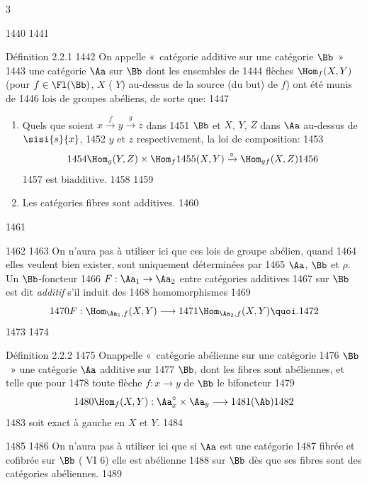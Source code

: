 3	\documentclass[10pt]{../fichiers-configuration-latex/smfart}
\begin{document}
  1440	
  1441	\begin{enonce*}{Définition 2.2.1}
  1442	On appelle « catégorie additive sur une catégorie $\Bb$ »
  1443	une catégorie $\Aa$ sur $\Bb$ dont les ensembles de
  1444	flèches $\Hom_f(X,Y)$ (pour $f\in \Fl (\Bb)$, $X$ (	$Y$) au-dessus de la source (\resp du but) de $f$) ont été munis de
  1446	lois de groupes abéliens, de sorte que:
  1447	\begin{enumerate}
  1448	\renewcommand{\theenumi}{\roman{enumi}}
  1449	\renewcommand{\labelenumi}{(\theenumi)}
  1450	\item Quels que soient $x\xrightarrow{f}y\xrightarrow{g}z$ dans
  1451	$\Bb$ et $X$, $Y$, $Z$ dans $\Aa$ au-dessus de $\sisi{s}{x}$,
  1452	$y$ et $z$ respectivement, la loi de composition:
  1453	\[
  1454	\Hom_g(Y,Z)\times \Hom_f
  1455	(X,Y)\xrightarrow{\circ}\Hom_{gf}(X,Z)
  1456	\]
  1457	est biadditive.
  1458	
  1459	\item Les catégories fibres sont additives.
  1460	\end{enumerate}
  1461	\end{enonce*}
  1462	
  1463	On n'aura pas à utiliser ici que ces lois de groupe abélien, quand
  1464	elles veulent bien exister, sont uniquement déterminées par
  1465	$\Aa$, $\Bb$ et $\rho$. Un $\Bb$-foncteur
  1466	$F:\Aa_1\rightarrow \Aa_2$ entre catégories additives
  1467	sur $\Bb$ est dit \emph{additif} s'il induit des
  1468	homomorphismes
  1469	\[
  1470	F:\Hom_{\Aa_1,f}(X,Y)\longrightarrow
  1471	\Hom_{\Aa_{2},f}(X,Y){\quoi}.
  1472	\]
  1473	
  1474	\begin{enonce*}{Définition 2.2.2}
  1475	On\pageoriginale appelle « catégorie abélienne sur une catégorie
  1476	$\Bb$ »  une catégorie $\Aa$ additive sur
  1477	$\Bb$, dont les fibres sont abéliennes, et telle que pour
  1478	toute flèche $f:x\rightarrow y$ de $\Bb$ le bifoncteur
  1479	\[
  1480	\Hom_f(X,Y):\Aa^{\circ}_x\times \Aa_y\longrightarrow
  1481	(\Ab)
  1482	\]
  1483	soit exact à gauche en $X$ et $Y$.
  1484	\end{enonce*}
  1485	
  1486	On n'aura pas à utiliser ici que si $\Aa$ est une catégorie
  1487	fibrée et cofibrée sur $\Bb$ ( VI 6) elle est abélienne
  1488	sur $\Bb$ dès que ses fibres sont des catégories abéliennes.
  1489	
\end{document}
